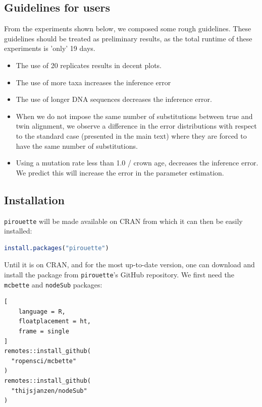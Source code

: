 \subsection{Guidelines for users}
\label{subsec:guidelines}

From the experiments shown below, we composed some rough guidelines.
These guidelines should be treated as preliminary results, as
the total runtime of these experiments is 'only' 19 days.

\begin{itemize}
  \item{
    The use of 20 replicates results in decent plots.
  }
  \item{
    The use of more taxa increases the inference error
  }
  \item{
    The use of longer DNA sequences decreases the inference error.
  }
  \item{
    When we do not impose the same number of substitutions 
    between true and twin alignment, we observe a difference in the error 
    distributions with respect to the standard case (presented in the main 
    text) where they are forced to have the same number of substitutions.
  }
  \item{
    Using a mutation rate less than 1.0 / crown age, decreases the
    inference error. We predict this will increase the error in the parameter
    estimation.
  }
\end{itemize}

\subsection{Installation}
\label{subsec:installation}

\verb;pirouette; will be made available on CRAN from which 
it can then be easily installed:
\begin{lstlisting}[language=R, floatplacement=ht, frame=single]
install.packages("pirouette")
\end{lstlisting}

Until it is on CRAN, and for the most up-to-date version, 
one can download and install the package from \verb;pirouette;'s GitHub 
repository. We first need the \verb;mcbette; and \verb;nodeSub; packages:
\begin{lstlisting}[
    language = R,
    floatplacement = ht,
    frame = single
]
remotes::install_github(
  "ropensci/mcbette"
)
remotes::install_github(
  "thijsjanzen/nodeSub"
)
\end{lstlisting}

